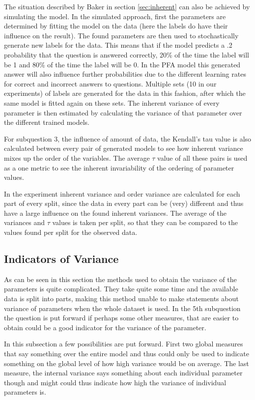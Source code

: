 \documentclass{scrartcl}
\begin{document}
The situation described by Baker in section \ref{sec:inherent} can also be achieved by simulating the model. In the simulated approach, first the parameters are determined by fitting the model on the data (here the labels do have their influence on the result). The found parameters are then used to stochastically generate new labels for the data. This means that if the model predicts a .2 probability that the question is answered correctly, 20\% of the time the label will be 1 and 80\% of the time the label will be 0. In the PFA model this generated answer will also influence further probabilities due to the different learning rates for correct and incorrect answers to questions. Multiple sets (10 in our experiments) of labels are generated for the data in this fashion, after which the same model is fitted again on these sets. The inherent variance of every parameter is then estimated by calculating the variance of that parameter over the different trained models.

For subquestion 3, the influence of amount of data, the Kendall's tau value is also calculated between every pair of generated models to see how inherent variance mixes up the order of the variables. The average $\tau$ value of all these pairs is used as a one metric to see the inherent invariability of the ordering of parameter values. 

In the experiment inherent variance and order variance are calculated for each part of every split, since the data in every part can be (very) different and thus have a large influence on the found inherent variances. The average of the variances and $\tau$ values is taken per split, so that they can be compared to the values found per split for the observed data. 

\subsection{Indicators of Variance}
\label{sec:perf}
As can be seen in this section the methods used to obtain the variance of the parameters is quite complicated. They take quite some time and the available data is split into parts, making this method unable to make statements about variance of parameters when the whole dataset is used. In the 5th subquestion the question is put forward if perhaps some other measures, that are easier to obtain could be a good indicator for the variance of the parameter.

In this subsection a few possibilities are put forward. First two global measures that say something over the entire model and thus could only be used to indicate something on the global level of how high variance would be on average. The last measure, the internal variance says something about each individual parameter though and might could thus indicate how high the variance of individual parameters is.
\end{document}
